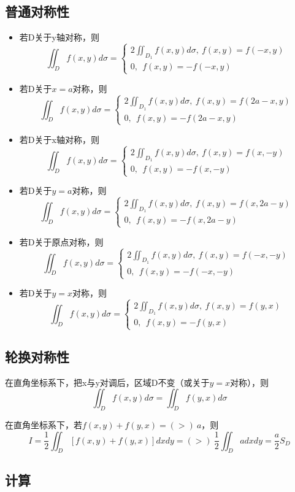 \subsection{普通对称性}
\begin{itemize}
    \item 若D关于y轴对称，则\[\iint_Df(x, y)d\sigma = \begin{cases}
        2\iint_{D_1}f(x, y)d\sigma,\ f(x, y) = f(-x, y) \\
        0,\ \ f(x, y) = -f(-x, y)
    \end{cases}\]

    \item 若D关于\(x = a\)对称，则\[\iint_Df(x, y)d\sigma = \begin{cases}
        2\iint_{D_1}f(x, y)d\sigma,\ f(x, y) = f(2a - x, y) \\ 
        0,\ \ f(x, y) = -f(2a - x, y)
    \end{cases}\]

    \item 若D关于x轴对称，则\[\iint_Df(x, y)d\sigma = \begin{cases}
        2\iint_{D_1}f(x, y)d\sigma,\ f(x, y) = f(x, -y) \\ 
        0,\ \ f(x, y) = -f(x, -y)
    \end{cases}\]

    \item 若D关于\(y = a\)对称，则\[\iint_Df(x, y)d\sigma = \begin{cases}
        2\iint_{D_1}f(x, y)d\sigma,\ f(x, y) = f(x, 2a - y) \\ 
        0,\ \ f(x, y) = -f(x, 2a - y)
    \end{cases}\]

    \item 若D关于原点对称，则\[\iint_Df(x, y)d\sigma = \begin{cases}
        2\iint_{D_1}f(x, y)d\sigma,\ f(x, y) = f(-x, -y) \\ 
        0,\ \ f(x, y) = -f(-x, -y)
    \end{cases}\]

    \item 若D关于\(y = x\)对称，则\[\iint_Df(x, y)d\sigma = \begin{cases}
        2\iint_{D_1}f(x, y)d\sigma,\ f(x, y) = f(y, x) \\ 
        0,\ \ f(x, y) = -f(y, x)
    \end{cases}\]
\end{itemize}


\subsection{轮换对称性}
在直角坐标系下，把x与y对调后，区域D不变（或关于\(y = x\)对称），则
\[\iint_Df(x, y)d\sigma = \iint_Df(y, x)d\sigma\]

在直角坐标系下，若\(f(x, y) + f(y, x) =(>)\ a\)，则
\[I = \dfrac{1}{2}\iint_D[f(x, y) + f(y, x)]dxdy =(>)\ \dfrac{1}{2}\iint_Dadxdy = \dfrac{a}{2}S_D\]


\subsection{计算}






